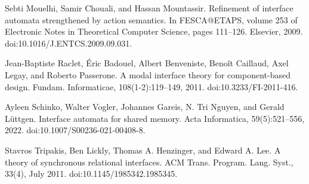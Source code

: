 \par\noindent  [22]  Sebti Mouelhi, Samir Chouali, and Hassan Mountassir.  Refinement of interface automata strengthened by action semantics.  In FESCA@ETAPS, volume 253 of Electronic Notes in Theoretical Computer Science, pages 111–126. Elsevier, 2009.  doi:10.1016/J.ENTCS.2009.09.031.  
 
\par\noindent  [23]  Jean-Baptiste Raclet, Éric Badouel, Albert Benveniste, Benoît Caillaud, Axel Legay, and Roberto Passerone.  A modal interface theory for component-based design.  Fundam. Informaticae, 108(1-2):119–149, 2011.  doi:10.3233/FI-2011-416.  
 
\par\noindent  [24]  Ayleen Schinko, Walter Vogler, Johannes Gareis, N. Tri Nguyen, and Gerald Lüttgen.  Interface automata for shared memory.  Acta Informatica, 59(5):521–556, 2022.  doi:10.1007/S00236-021-00408-8.  
 
\par\noindent  [25]  Stavros Tripakis, Ben Lickly, Thomas A. Henzinger, and Edward A. Lee.  A theory of synchronous relational interfaces.  ACM Trans. Program. Lang. Syst., 33(4), July 2011.  doi:10.1145/1985342.1985345.  
  

